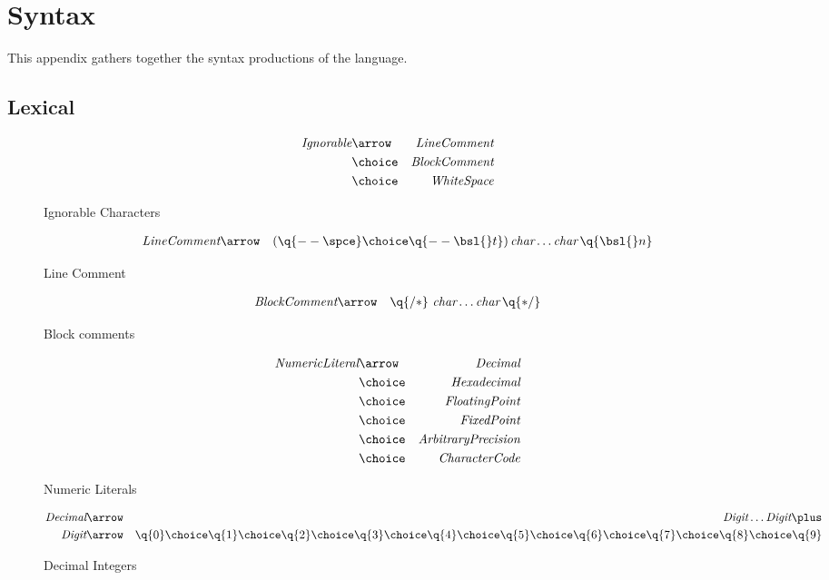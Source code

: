 \chapter{Syntax}
\label{syntax}
This appendix gathers together the syntax productions of the \Sr language.

\section{Lexical}

\begin{figure}[htbp]
\begin{eqnarray*}
\emph{Ignorable}&\arrow&\emph{LineComment}\\
&\choice&\emph{BlockComment}\\
&\choice&\emph{WhiteSpace}
\end{eqnarray*}
\caption{Ignorable Characters}\label{ignorableFigA}
\end{figure}

\begin{figure}[htbp]
\begin{eqnarray*}
\emph{LineComment}&\arrow&(\q{--\spce}\choice\q{--\bsl{}t})\,\emph{char}\ldots\emph{char}\,\q{\bsl{}n}
\end{eqnarray*}
\caption{Line Comment}
\label{lineCommentFigA}
\end{figure}

\begin{figure}[htbp]
\begin{eqnarray*}
\emph{BlockComment}&\arrow&\q{/*}\ \emph{char}\ldots\emph{char}\,\q{*/}
\end{eqnarray*}
\caption{Block comments}
\label{blockCommentFigA}
\end{figure}

\begin{figure}[htbp]
\begin{eqnarray*}
\emph{NumericLiteral}&\arrow&\emph{Decimal}\\
&\choice&\emph{Hexadecimal}\\
&\choice&\emph{FloatingPoint}\\
&\choice&\emph{FixedPoint}\\
&\choice&\emph{ArbitraryPrecision}\\
&\choice&\emph{CharacterCode}
\end{eqnarray*}
\caption{Numeric Literals}
\label{numberFig}
\end{figure}

\begin{figure}[htbp]
\begin{eqnarray*}
\emph{Decimal}&\arrow&\emph{Digit}\ldots\emph{Digit}\plus\\
\emph{Digit}&\arrow&\q{0}\choice\q{1}\choice\q{2}\choice\q{3}\choice\q{4}\choice\q{5}\choice\q{6}\choice\q{7}\choice\q{8}\choice\q{9}
\end{eqnarray*}
\caption{Decimal Integers}
\label{decimalFig}
\end{figure}

